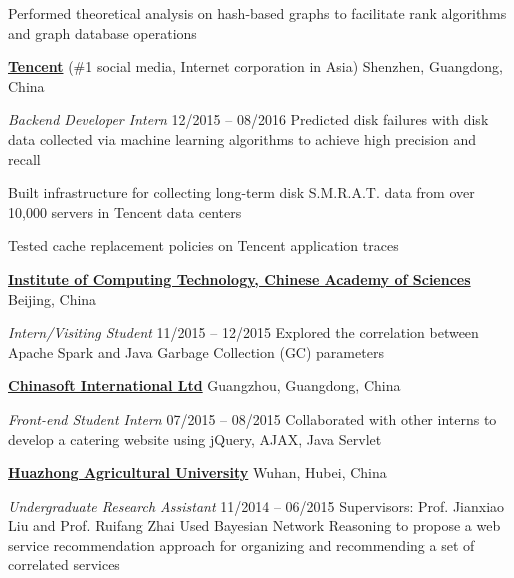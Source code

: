 \documentclass[letterpaper,10pt,oneside]{article}
\begin{document}
\begin{body}
\GapNoBreak
\BulletItem
Performed theoretical analysis on hash-based graphs to facilitate rank algorithms and graph database operations


\BigGap
\href{https://www.tencent.com/en-us/index.html}
{\textbf{Tencent}} (\#1 social media, Internet corporation in Asia)
\hfill
Shenzhen, Guangdong, China

\emph{Backend Developer Intern}
\hfill
12/2015 --
08/2016
\GapNoBreak
\BulletItem
Predicted disk failures with disk data collected via machine learning algorithms to achieve high precision and recall

\GapNoBreak
\BulletItem
Built infrastructure for collecting long-term disk S.M.R.A.T. data from over 10,000 servers in Tencent data centers

\GapNoBreak
\BulletItem
Tested cache replacement policies on Tencent application traces

\BigGap
\href{http://english.ict.cas.cn/}
{\textbf{Institute of Computing Technology, Chinese Academy of Sciences}}
\hfill
Beijing, China

\emph{Intern/Visiting Student}
\hfill
11/2015 --
12/2015
\GapNoBreak
\BulletItem
Explored the correlation between Apache Spark and Java Garbage Collection (GC) parameters

\BigGap
\href{http://www.chinasofti.com/en/index.shtml}
{\textbf{Chinasoft International Ltd}}
\hfill
Guangzhou, Guangdong, China

\emph{Front-end Student Intern}
\hfill
07/2015 --
08/2015
\GapNoBreak
\BulletItem
Collaborated with other interns to develop a catering website using jQuery, AJAX, Java Servlet

\BigGap
\href{http://www.hzau.edu.cn/en/HOME.htm}
{\textbf{Huazhong Agricultural University}}
\hfill
Wuhan, Hubei, China

\emph{Undergraduate Research Assistant}
\hfill
11/2014 --
06/2015
\GapNoBreak
Supervisors: Prof. Jianxiao Liu and Prof. Ruifang Zhai
\GapNoBreak
\BulletItem
Used Bayesian Network Reasoning to propose a web service recommendation approach for organizing and recommending a set of correlated services


\end{body}
\end{document}
